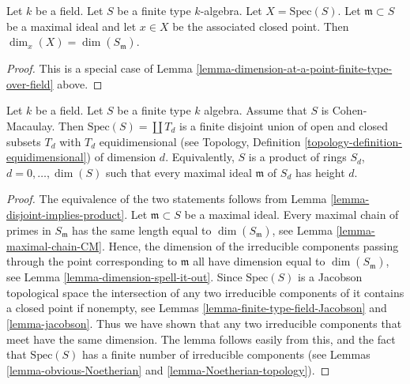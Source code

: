 \begin{lemma}
\label{lemma-dimension-closed-point-finite-type-field}
Let $k$ be a field.
Let $S$ be a finite type $k$-algebra.
Let $X = \text{Spec}(S)$.
Let $\mathfrak m \subset S$ be a maximal ideal and let
$x \in X$ be the associated closed point.
Then $\dim_x(X) = \dim(S_{\mathfrak m})$.
\end{lemma}

\begin{proof}
This is a special case of
Lemma \ref{lemma-dimension-at-a-point-finite-type-over-field} above.
\end{proof}

\begin{lemma}
\label{lemma-disjoint-decomposition-CM-algebra}
Let $k$ be a field.
Let $S$ be a finite type $k$ algebra.
Assume that $S$ is Cohen-Macaulay.
Then $\text{Spec}(S) = \coprod T_d$ is a finite disjoint union of
open and closed subsets $T_d$ with $T_d$ equidimensional
(see Topology, Definition \ref{topology-definition-equidimensional})
of dimension $d$. Equivalently, $S$ is a product of rings
$S_d$, $d = 0, \ldots, \dim(S)$ such that every maximal ideal
$\mathfrak m$ of $S_d$ has height $d$.
\end{lemma}

\begin{proof}
The equivalence of the two statements follows from
Lemma \ref{lemma-disjoint-implies-product}.
Let $\mathfrak m \subset S$ be a maximal ideal.
Every maximal chain of primes in $S_{\mathfrak m}$ has
the same length equal to $\dim(S_{\mathfrak m})$, see
Lemma \ref{lemma-maximal-chain-CM}. Hence, the dimension of the irreducible
components passing through the point corresponding to $\mathfrak m$
all have dimension equal to $\dim(S_{\mathfrak m})$, see
Lemma \ref{lemma-dimension-spell-it-out}.
Since $\text{Spec}(S)$ is a Jacobson topological space
the intersection
of any two irreducible components of it contains a closed point if nonempty,
see Lemmas \ref{lemma-finite-type-field-Jacobson}
and
\ref{lemma-jacobson}.
Thus we have shown that any two irreducible components
that meet have the same dimension. The lemma follows
easily from this, and the fact that $\text{Spec}(S)$
has a finite number of irreducible components (see
Lemmas \ref{lemma-obvious-Noetherian} and \ref{lemma-Noetherian-topology}).
\end{proof}
















